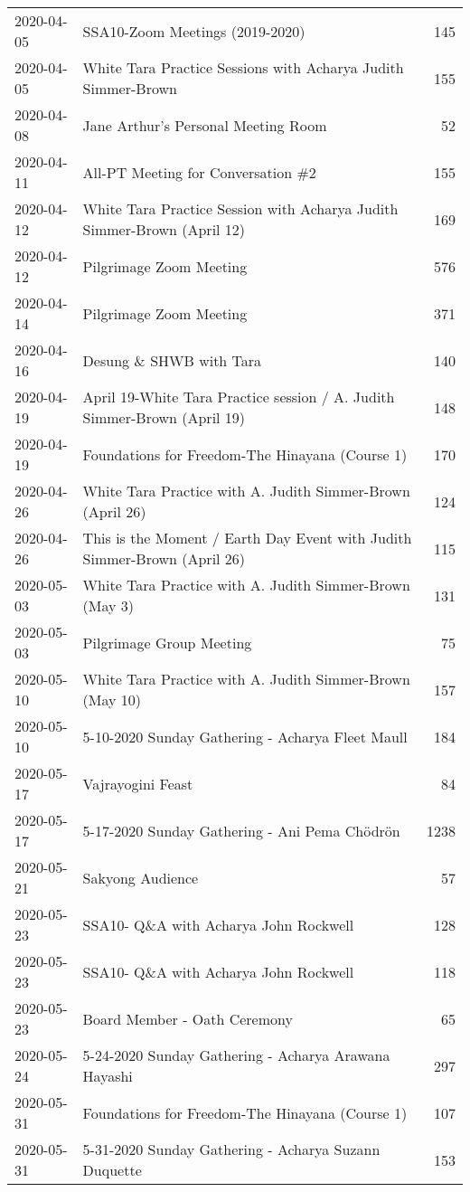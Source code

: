 \documentclass[
]{article}
\begin{document}
\begin{longtable}[]{@{}llr@{}}
2020-04-05 & SSA10-Zoom Meetings (2019-2020) & 145\tabularnewline
2020-04-05 & White Tara Practice Sessions with Acharya Judith
Simmer-Brown & 155\tabularnewline
2020-04-08 & Jane Arthur's Personal Meeting Room & 52\tabularnewline
2020-04-11 & All-PT Meeting for Conversation \#2 & 155\tabularnewline
2020-04-12 & White Tara Practice Session with Acharya Judith
Simmer-Brown (April 12) & 169\tabularnewline
2020-04-12 & Pilgrimage Zoom Meeting & 576\tabularnewline
2020-04-14 & Pilgrimage Zoom Meeting & 371\tabularnewline
2020-04-16 & Desung \& SHWB with Tara & 140\tabularnewline
2020-04-19 & April 19-White Tara Practice session / A. Judith
Simmer-Brown (April 19) & 148\tabularnewline
2020-04-19 & Foundations for Freedom-The Hinayana (Course 1) &
170\tabularnewline
2020-04-26 & White Tara Practice with A. Judith Simmer-Brown (April 26)
& 124\tabularnewline
2020-04-26 & This is the Moment / Earth Day Event with Judith
Simmer-Brown (April 26) & 115\tabularnewline
2020-05-03 & White Tara Practice with A. Judith Simmer-Brown (May 3) &
131\tabularnewline
2020-05-03 & Pilgrimage Group Meeting & 75\tabularnewline
2020-05-10 & White Tara Practice with A. Judith Simmer-Brown (May 10) &
157\tabularnewline
2020-05-10 & 5-10-2020 Sunday Gathering - Acharya Fleet Maull &
184\tabularnewline
2020-05-17 & Vajrayogini Feast & 84\tabularnewline
2020-05-17 & 5-17-2020 Sunday Gathering - Ani Pema Chödrön &
1238\tabularnewline
2020-05-21 & Sakyong Audience & 57\tabularnewline
2020-05-23 & SSA10- Q\&A with Acharya John Rockwell & 128\tabularnewline
2020-05-23 & SSA10- Q\&A with Acharya John Rockwell & 118\tabularnewline
2020-05-23 & Board Member - Oath Ceremony & 65\tabularnewline
2020-05-24 & 5-24-2020 Sunday Gathering - Acharya Arawana Hayashi &
297\tabularnewline
2020-05-31 & Foundations for Freedom-The Hinayana (Course 1) &
107\tabularnewline
2020-05-31 & 5-31-2020 Sunday Gathering - Acharya Suzann Duquette &
153\tabularnewline
\bottomrule
\end{longtable}
\end{document}
